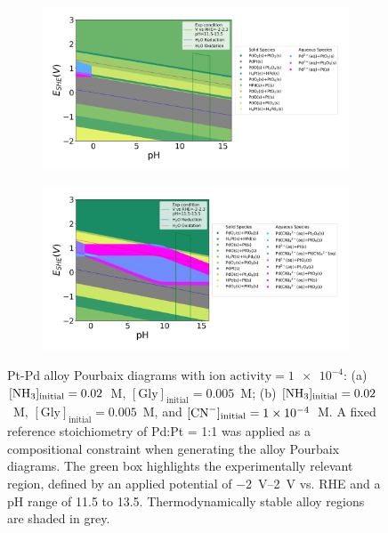 \documentclass[journal=jacsat,manuscript=article]{achemso}
\begin{document}
\begin{figure}[htbp]
    \centering
    \begin{subfigure}[b]{0.45\textwidth}
        \subcaption{}\label{fig:PdPt_Pourbaix_NH3_Gly}
        \includegraphics[width=\textwidth]
        {Figures/alloy_pourbaix_diagrams/Pd_Pt_alloy_Pd0.5 Pt0.5_NH3=0.02M_Gly=0.005M_CN=0M_activity=1e-04M.png}
    \end{subfigure}
    \begin{subfigure}[b]{0.45\textwidth}
        \subcaption{}\label{fig:PdPt_Pourbaix_NH3_Gly_CN}
        \includegraphics[width=\textwidth]{Figures/alloy_pourbaix_diagrams/Pd_Pt_alloy_Pd0.5 Pt0.5_NH3=0.02M_Gly=0.005M_CN=0.0001M_activity=1e-04M.png}
    \end{subfigure}
    \caption{Pt-Pd alloy Pourbaix diagrams with $\text{ion activity} = \num{1e-4}$: (a) $[\ce{NH3}]_\text{initial} = 0.02$~M, $[\text{Gly}]_\text{initial} = 0.005$~M; (b) $[\ce{NH3}]_\text{initial} = 0.02$~M, $[\text{Gly}]_\text{initial} = 0.005$~M, and $[\ce{CN^-}]_\text{initial} = \num{1e-4}$~M. A fixed reference stoichiometry of Pd:Pt = 1:1 was applied as a compositional constraint when generating the alloy Pourbaix diagrams. The green box highlights the experimentally relevant region, defined by an applied potential of \SIrange{-2}{2}{V} vs. RHE and a pH range of 11.5 to 13.5. Thermodynamically stable alloy regions are shaded in grey.}
    \label{fig:PdPt_alloy_Pourbaix}
\end{figure}
\end{document}
